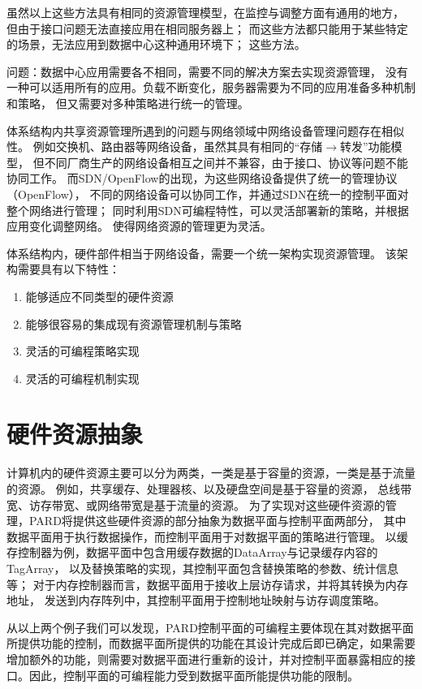 虽然以上这些方法具有相同的资源管理模型，在监控与调整方面有通用的地方，
但由于接口问题无法直接应用在相同服务器上；
而这些方法都只能用于某些特定的场景，无法应用到数据中心这种通用环境下；
这些方法。

问题：数据中心应用需要各不相同，需要不同的解决方案去实现资源管理，
没有一种可以适用所有的应用。负载不断变化，服务器需要为不同的应用准备多种机制和策略，
但又需要对多种策略进行统一的管理。

体系结构内共享资源管理所遇到的问题与网络领域中网络设备管理问题存在相似性。
例如交换机、路由器等网络设备，虽然其具有相同的``存储$\rightarrow$转发''功能模型，
但不同厂商生产的网络设备相互之间并不兼容，由于接口、协议等问题不能协同工作。
而SDN/OpenFlow的出现，为这些网络设备提供了统一的管理协议（OpenFlow），
不同的网络设备可以协同工作，并通过SDN在统一的控制平面对整个网络进行管理；
同时利用SDN可编程特性，可以灵活部署新的策略，并根据应用变化调整网络。
使得网络资源的管理更为灵活。


体系结构内，硬件部件相当于网络设备，需要一个统一架构实现资源管理。
该架构需要具有以下特性：

\begin{enumerate}[{(}1{)}]
  \item 能够适应不同类型的硬件资源
  \item 能够很容易的集成现有资源管理机制与策略
  \item 灵活的可编程策略实现
  \item 灵活的可编程机制实现
\end{enumerate}


\section{硬件资源抽象}

计算机内的硬件资源主要可以分为两类，一类是基于容量的资源，一类是基于流量的资源。
例如，共享缓存、处理器核、以及硬盘空间是基于容量的资源，
总线带宽、访存带宽、或网络带宽是基于流量的资源。
为了实现对这些硬件资源的管理，PARD将提供这些硬件资源的部分抽象为数据平面与控制平面两部分，
其中数据平面用于执行数据操作，而控制平面用于对数据平面的策略进行管理。
以缓存控制器为例，数据平面中包含用缓存数据的DataArray与记录缓存内容的TagArray，
以及替换策略的实现，其控制平面包含替换策略的参数、统计信息等；
对于内存控制器而言，数据平面用于接收上层访存请求，并将其转换为内存地址，
发送到内存阵列中，其控制平面用于控制地址映射与访存调度策略。

从以上两个例子我们可以发现，PARD控制平面的可编程主要体现在其对数据平面所提供功能的控制，而数据平面所提供的功能在其设计完成后即已确定，如果需要增加额外的功能，则需要对数据平面进行重新的设计，并对控制平面暴露相应的接口。因此，控制平面的可编程能力受到数据平面所能提供功能的限制。

